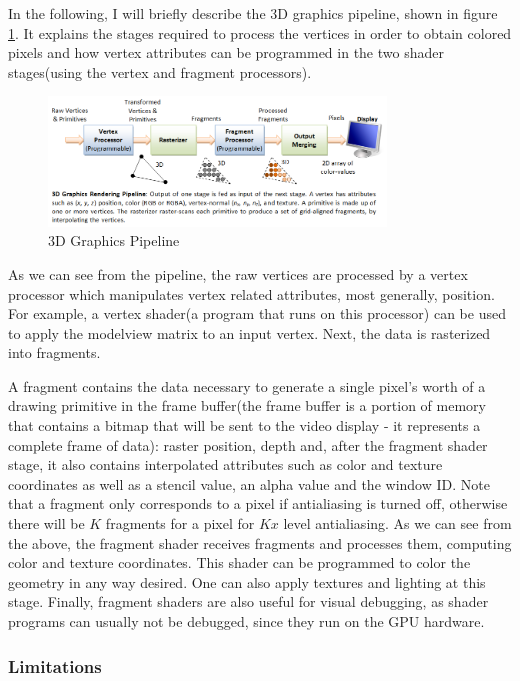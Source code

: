 \documentclass[]{article}
\begin{document}
In the following, I will briefly describe the 3D graphics pipeline, shown in figure \ref{fig:GraphicsPipeline}. It explains the stages required to process the vertices in order to obtain colored pixels and how vertex attributes can be programmed in the two shader stages(using the vertex and fragment processors).

\begin{figure}[hbtp]
    \centering
    \includegraphics[width=0.8\textwidth]{figures/Graphics3D_Pipe.png}
    \caption{3D Graphics Pipeline}
    \label{fig:GraphicsPipeline}
\end{figure}

As we can see from the pipeline, the raw vertices are processed by a vertex processor which manipulates vertex related attributes, most generally, position. For example, a vertex shader(a program that runs on this processor) can be used to apply the modelview matrix to an input vertex. Next, the data is rasterized into fragments.
 
A fragment contains the data necessary to generate a single pixel's worth of a drawing primitive in the frame buffer(the frame buffer is a portion of memory that contains a bitmap that will be sent to the video display - it represents a complete frame of data): raster position, depth and, after the fragment shader stage, it also contains interpolated attributes such as color and texture coordinates as well as a stencil value, an alpha value and the window ID. Note that a fragment only corresponds to a pixel if antialiasing is turned off, otherwise there will be $K$ fragments for a pixel for $Kx$ level antialiasing.
As we can see from the above, the fragment shader receives fragments and processes them, computing color and texture coordinates. This shader can be programmed to color the geometry in any way desired. One can also apply textures and lighting at this stage. Finally, fragment shaders are also useful for visual debugging, as shader programs can usually not be debugged, since they run on the GPU hardware.\\

\subsubsection{Limitations}
\end{document}
